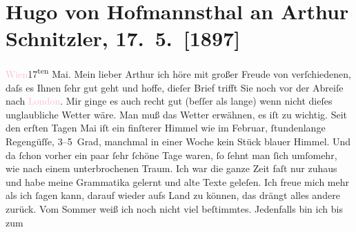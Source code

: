 

               \section[Hugo von Hofmannsthal an Arthur Schnitzler, 17. 5. {[}1897{]}]{ Hugo von Hofmannsthal an Arthur Schnitzler, 17. 5. {[}1897{]}}\nopagebreak{}\rehead{ }\normalsize\beginnumbering{} \toendnotes[C]{\smallbreak\pagebreak[2]} 
\pstart
           \raggedleft{}{\pb}\textcolor{pink}{Wien}{}\ledrightnote{\textcolor{pink}{Wien}}{ }17\textsuperscript{ten} Mai.\pend
           \pstart{}Mein lieber Arthur\pend\pstart
           ich höre mit großer Freude von verſchiedenen, daſs es Ihnen ſehr gut  geht und hoffe, dieſer Brief trifft Sie noch
                    vor der Abreiſe nach \textcolor{pink}{London}{}\ledrightnote{\textcolor{pink}{London}}. Mir ginge es auch
                    recht gut (beſſer als lange) wenn nicht dieſes unglaubliche Wetter wäre. Man muß
                    das Wetter erwähnen, es iſt {\pb}zu wichtig. Seit den erſten Tagen Mai iſt ein finſterer Himmel
                    wie im Februar, ſtundenlange Regengüſſe, 3–5 Grad, manchmal in einer Woche kein
                    Stück blauer Himmel. Und da ſchon vorher ein paar ſehr ſchöne Tage waren, ſo
                    ſehnt man ſich umſomehr, wie nach einem unterbrochenen Traum. Ich war die ganze
                    Zeit faſt nur zuhaus und habe meine Grammatika gelernt {\pb}und alte Texte geleſen. Ich
                    freue mich mehr als ich ſagen kann, darauf wieder aufs Land zu können, das
                    drängt alles andere zurück.\pend
           \pstart
           Vom Sommer weiß ich noch nicht viel beſtimmtes. Jedenfalls bin ich bis zum
